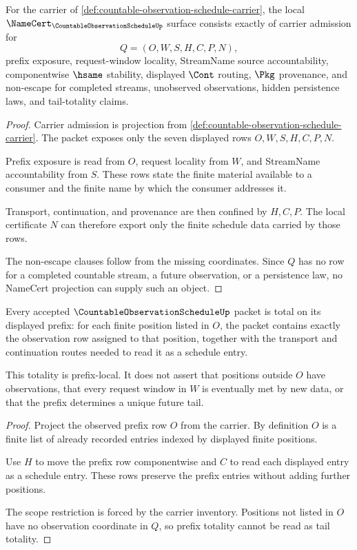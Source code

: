 \begin{theorem}
\label{thm:countable-observation-schedule-namecert-obligations}
For the carrier of \autoref{def:countable-observation-schedule-carrier}, the local $\NameCert_{\CountableObservationScheduleUp}$ surface consists exactly of carrier admission for
$$
Q=(O,W,S,H,C,P,N),
$$
prefix exposure, request-window locality, StreamName source accountability, componentwise $\hsame$ stability, displayed $\Cont$ routing, $\Pkg$ provenance, and non-escape for completed streams, unobserved observations, hidden persistence laws, and tail-totality claims.
\end{theorem}
\begin{proof}
Carrier admission is projection from \autoref{def:countable-observation-schedule-carrier}. The packet exposes only the seven displayed rows $O,W,S,H,C,P,N$.

Prefix exposure is read from $O$, request locality from $W$, and StreamName accountability from $S$. These rows state the finite material available to a consumer and the finite name by which the consumer addresses it.

Transport, continuation, and provenance are then confined by $H,C,P$. The local certificate $N$ can therefore export only the finite schedule data carried by those rows.

The non-escape clauses follow from the missing coordinates. Since $Q$ has no row for a completed countable stream, a future observation, or a persistence law, no NameCert projection can supply such an object.
\end{proof}

\begin{theorem}
\label{thm:countable-observation-schedule-prefix-totality}
Every accepted $\CountableObservationScheduleUp$ packet is total on its displayed prefix: for each finite position listed in $O$, the packet contains exactly the observation row assigned to that position, together with the transport and continuation routes needed to read it as a schedule entry.

This totality is prefix-local. It does not assert that positions outside $O$ have observations, that every request window in $W$ is eventually met by new data, or that the prefix determines a unique future tail.
\end{theorem}
\begin{proof}
Project the observed prefix row $O$ from the carrier. By definition $O$ is a finite list of already recorded entries indexed by displayed finite positions.

Use $H$ to move the prefix row componentwise and $C$ to read each displayed entry as a schedule entry. These rows preserve the prefix entries without adding further positions.

The scope restriction is forced by the carrier inventory. Positions not listed in $O$ have no observation coordinate in $Q$, so prefix totality cannot be read as tail totality.
\end{proof}

